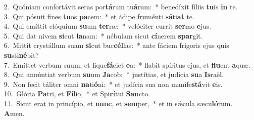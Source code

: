 {2.~}Quóniam confortávit seras por\textbf{tá}rum tu\textbf{á}rum:~* benedíxit fíliis \textbf{tu}is \textbf{in} te.\\
{3.~}Qui pósuit fines \textbf{tu}os \textbf{pa}cem:~* et ádipe fruménti \textbf{sá}ti\textbf{at} te.\\
{4.~}Qui emíttit elóquium \textbf{su}um \textbf{ter}ræ:~* velóciter currit \textbf{ser}mo \textbf{e}jus.\\
{5.~}Qui dat nivem \textbf{si}cut \textbf{la}nam:~* nébulam sicut \textbf{cí}nerem \textbf{spar}git.\\
{6.~}Mittit crystállum suam \textbf{si}cut buc\textbf{cél}las:~* ante fáciem frígoris ejus quis \textbf{su}sti\textbf{né}bit?\\
{7.~}Emíttet verbum suum, et lique\textbf{fá}ciet \textbf{e}a:~* flabit spíritus ejus, et \textbf{flu}ent \textbf{a}quæ.\\
{8.~}Qui annúntiat verbum \textbf{su}um \textbf{Ja}cob:~* justítias, et judícia \textbf{su}a \textbf{Is}raël.\\
{9.~}Non fecit táliter omni \textbf{na}ti\textbf{ó}ni:~* et judícia sua non manife\textbf{stá}vit \textbf{e}is.\\
{10.~}Glória \textbf{Pa}tri, et \textbf{Fí}lio,~* et Spi\textbf{rí}tui \textbf{San}cto.\\
{11.~}Sicut erat in princípio, et \textbf{nunc}, et \textbf{sem}per,~* et in sǽcula sæcu\textbf{ló}rum. \textbf{A}men.\\
